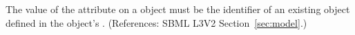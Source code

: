 The value of the attribute  on a \Model object must
be the identifier of an existing \Parameter object defined in the \Model
object's \ListOfParameters.  (References: SBML L3V2
Section~\ref{sec:model}.)
